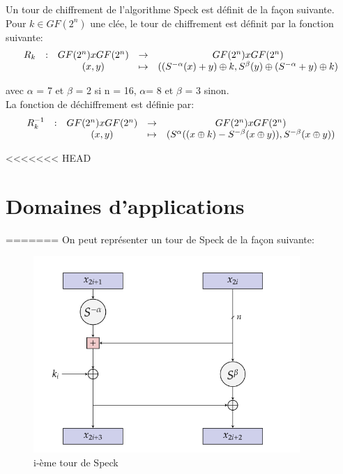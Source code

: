 			Un tour de chiffrement de l'algorithme Speck est définit de la façon suivante. \\
			Pour $k \in GF(2^n)$ une clée, le tour de chiffrement est définit par la fonction suivante:
			\[
			\begin{array}{ccccc}
			R_k & : & GF(2^n) x GF(2^n) & \to & GF(2^n) x GF(2^n) \\
			 & & (x,y) & \mapsto & ((S^{-\alpha}(x) + y) \mathbin{\oplus} k, S^\beta (y) \mathbin{\oplus} (S^{-\alpha} + y) \mathbin{\oplus} k) \\
			\end{array}
			\]

			avec $\alpha$ = 7 et $\beta$ = 2 si n = 16, $\alpha $= 8 et $\beta$ = 3 sinon. \\

			La fonction de déchiffrement est définie par:
			\[
			\begin{array}{ccccc}
			R_k^{-1} & : & GF(2^n) x GF(2^n) & \to & GF(2^n) x GF(2^n) \\
			 & & (x,y) & \mapsto & (S^\alpha ((x \mathbin{\oplus} k) - S^{-\beta}(x \mathbin{\oplus} y)), S^{-\beta}(x \mathbin{\oplus} y)) \\
			\end{array}
			\]

<<<<<<< HEAD
	\section{Domaines d'applications}

=======
			On peut représenter un tour de Speck de la façon suivante:

			\begin{figure}[!h]
				\centering
				\includegraphics[width=0.9\textwidth]{imgs/roundSpeck.png}
				\caption{i-ème tour de Speck}
			 	\label{roundSpeck}
			\end{figure}

